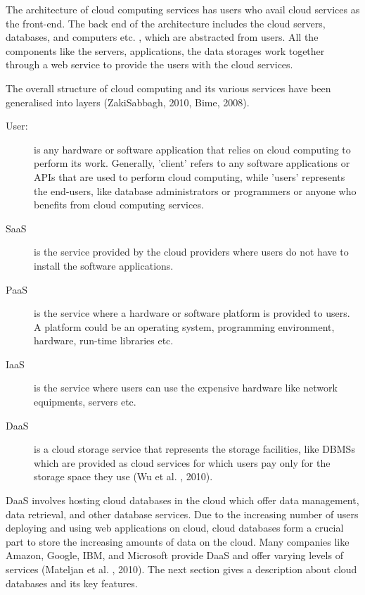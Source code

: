 The architecture of cloud computing services has users who avail cloud services
as the front-end.  The back end of the architecture includes the cloud servers,  
databases,   and computers etc. ,   which are abstracted from users.  All the
components like the servers,   applications,   the data storages work together
through a web service to provide the users with the cloud services. 

The overall structure of cloud computing and its various services have been
generalised into layers (ZakiSabbagh,   2010,   Bime,   2008). 

\begin{description}

	\item [User:] is any hardware or software application that relies on cloud
	computing to perform its work.  Generally,   'client' refers to any software applications or
	\acp{API}  that are used to perform cloud computing,  
	while 'users' represents the end-users,   like  database administrators or
	programmers or anyone who benefits from cloud computing services. 
	
	\item [\acf{SaaS}] is the service provided by the cloud
	providers where users do not have to install the software applications. 
	
	\item [\acf{PaaS}] is the service where a hardware or
	software platform is provided to users.  A platform could be an operating system,  
	programming environment,   hardware,   run-time libraries etc. 
	
	\item [\acf{IaaS}] is the service where users can use
	the expensive hardware like network equipments,   servers etc. 
	
	\item [\acf{DaaS}] is a cloud storage service  that represents
	the storage facilities,   like  \acp{DBMS} which are provided
	as cloud services for which users pay only for the storage space they use (Wu et
	al. ,   2010). 

\end{description}


\ac{DaaS} involves hosting cloud databases in the cloud which offer data
management,   data retrieval,   and other database services.  Due to the
increasing number of users deploying and using web applications on cloud,  
cloud databases form a crucial part to store the increasing amounts of data
on the cloud.  Many companies like Amazon,   Google,   IBM,   and Microsoft
provide \ac{DaaS} and offer varying levels of services (Mateljan et al. ,  
2010). The next section gives a description about cloud databases and its key
features.

